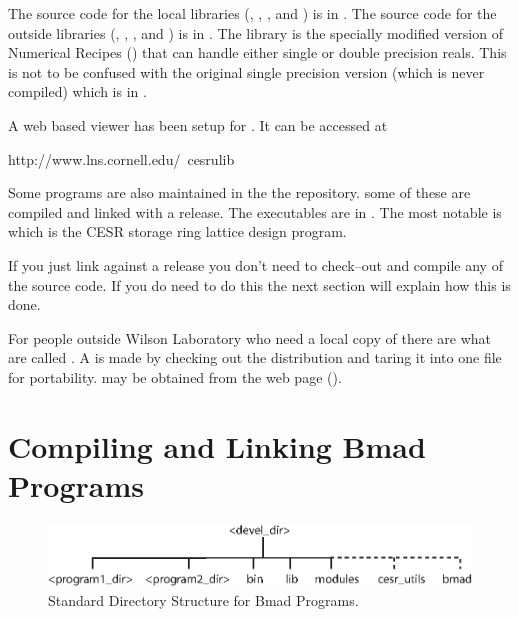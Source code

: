 The source code for the local libraries (, ,
, and ) is in . The
source code for the outside libraries (, ,
, and ) is in . The
 library is the specially modified version of
Numerical Recipes () that can handle either single or
double precision reals. This is not to be confused with the original
single precision version (which is never compiled) 
which is in . 

A web based viewer has been setup for \bmad. It can be accessed at
\begin{example}
  http://www.lns.cornell.edu/~cesrulib
\end{example}

Some programs are also maintained in the the \cvs repository. some of
these are compiled and linked with a release. The executables are in
. The most notable is  which is the CESR
storage ring lattice design program.

If you just link against a release you don't need to check--out and
compile any of the \bmad source code. If you do need to do this the
next section will explain how this is done.

For people outside Wilson Laboratory who need a local copy of \bmad
there are what are called . A  is
made by checking out the \bmad distribution and taring it into one
file for portability.  may be obtained from the
\bmad web page ().

\section{Compiling and Linking Bmad Programs}
\label{s:compile}

\begin{figure}[tb]
\begin{centering}
\includegraphics{devel_dir.eps}
\caption{Standard Directory Structure for Bmad Programs.}
\end{centering}
\label{f:devel_dir}
\end{figure}

